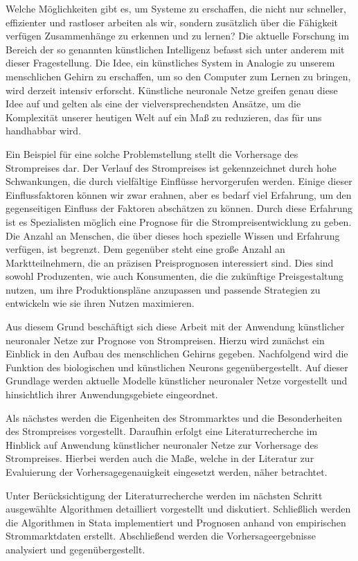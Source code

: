 Welche Möglichkeiten gibt es, um Systeme zu erschaffen, die nicht nur schneller, effizienter und rastloser arbeiten als wir, sondern zusätzlich über die Fähigkeit verfügen Zusammenhänge zu erkennen und zu lernen? Die aktuelle Forschung im Bereich der so genannten künstlichen Intelligenz befasst sich unter anderem mit dieser Fragestellung. Die Idee, ein künstliches System in Analogie zu unserem menschlichen Gehirn zu erschaffen, um so den Computer zum Lernen zu bringen, wird derzeit intensiv erforscht. 
\newpage
Künstliche neuronale Netze greifen genau diese Idee auf und gelten als eine der vielversprechendsten Ansätze, um die Komplexität unserer heutigen Welt auf ein Maß zu reduzieren, das für uns handhabbar wird.\par\medskip

Ein Beispiel für eine solche Problemstellung stellt die Vorhersage des Strompreises dar. Der Verlauf des Strompreises ist gekennzeichnet durch hohe Schwankungen, die durch vielfältige Einflüsse hervorgerufen werden. Einige dieser Einflussfaktoren können wir zwar erahnen, aber es bedarf viel Erfahrung, um den gegenseitigen Einfluss der Faktoren abschätzen zu können. Durch diese Erfahrung ist es Spezialisten möglich eine Prognose für die Strompreisentwicklung zu geben. Die Anzahl an Menschen, die über dieses hoch spezielle Wissen und Erfahrung verfügen, ist begrenzt. Dem gegenüber steht eine große Anzahl an Marktteilnehmern, die an präzisen Preisprognosen interessiert sind. Dies sind sowohl Produzenten, wie auch Konsumenten, die die zukünftige Preisgestaltung nutzen, um ihre Produktionspläne anzupassen und passende Strategien zu entwickeln wie sie ihren Nutzen maximieren.\par\medskip

Aus diesem Grund beschäftigt sich diese Arbeit mit der Anwendung künstlicher neuronaler Netze zur Prognose von Strompreisen. Hierzu wird zunächst ein Einblick in den Aufbau des menschlichen Gehirns gegeben. Nachfolgend wird die Funktion des biologischen und künstlichen Neurons gegenübergestellt. Auf dieser Grundlage werden aktuelle Modelle künstlicher neuronaler Netze vorgestellt und hinsichtlich ihrer Anwendungsgebiete eingeordnet.\par\medskip

Als nächstes werden die Eigenheiten des Strommarktes und die Besonderheiten des Strompreises vorgestellt. Daraufhin erfolgt eine Literaturrecherche im Hinblick auf Anwendung künstlicher neuronaler Netze zur Vorhersage des Strompreises. Hierbei werden auch die Maße, welche in der Literatur zur Evaluierung der Vorhersagegenauigkeit eingesetzt werden, näher betrachtet.\par\medskip

Unter Berücksichtigung der Literaturrecherche werden im nächsten Schritt ausgewählte Algorithmen detailliert vorgestellt und diskutiert. Schließlich werden die Algorithmen in Stata implementiert und Prognosen anhand von empirischen Strommarktdaten erstellt. Abschließend werden die Vorhersageergebnisse analysiert und gegenübergestellt.


\newpage

